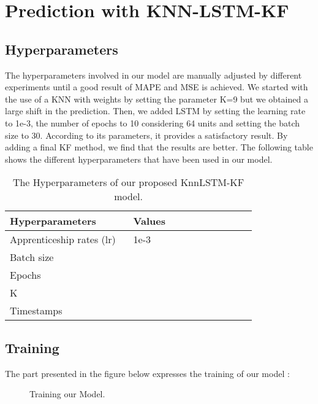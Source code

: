 \section{Prediction with KNN-LSTM-KF}

\subsection{Hyperparameters}
The hyperparameters involved in our model are manually adjusted by different experiments until a good result of MAPE and MSE is achieved. We started with the use of a KNN with weights by setting the parameter K=9 but we obtained a large shift in the prediction. Then, we added LSTM by setting the learning rate to 1e-3, the number of epochs to 10 considering 64 units and setting the batch size to 30. According to its parameters, it provides a satisfactory result. By adding a final KF method, we find that the results are better. The following table shows the different hyperparameters that have been used in our model.

\begin{table}[!hbt]
	\caption{The Hyperparameters of our proposed KnnLSTM-KF model.} 
	\centering
	\begin{tabular}{>{\centering}p{0.4\linewidth}|>{\centering\arraybackslash}p{0.4\linewidth}}
		\hline  
		\textbf{ Hyperparameters }
		&    \textbf{Values}\\  
		\hline
		Apprenticeship rates (lr) & 1e-3\\   
		\hline 
		Batch size & 30\\       
		\hline 
		Epochs & 10\\ 
		\hline
		K & 9\\          
		\hline
		Timestamps & 20\\
		\hline
		
	\end{tabular}
\end{table}
\pagebreak

\subsection{Training}
The part presented in the figure below expresses the training of our model :

\begin{figure}[!h]
	\begin{center}
	\end{center}
	\caption{Training our Model.}
	\label{Training our Model}
\end{figure}

